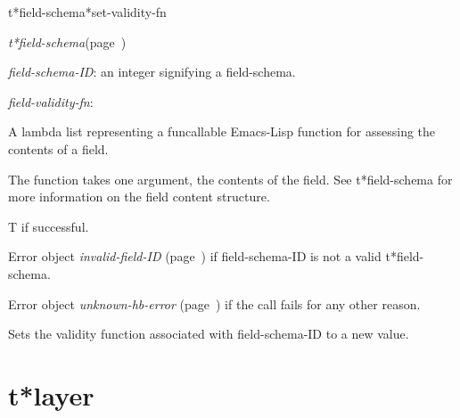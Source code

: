 \begin{description}
\item [Name:]  t*field-schema*set-validity-fn

\item [Class:] {\sl t*field-schema}\hfill(page~\pageref{t*field-schema})

\item [Parameters:]
\item {\sl field-schema-ID}:  an integer signifying a field-schema.

\item {\sl field-validity-fn}:  

A lambda list representing a funcallable Emacs-Lisp function for
assessing the contents of a field.

The function takes one argument, the contents of the field.
See t*field-schema for more information on the field content
structure.




\item [Return-value:] 
T if successful.

Error object {\sl invalid-field-ID} (page~\pageref{invalid-field-ID}) if field-schema-ID is not a valid t*field-schema.

Error object {\sl unknown-hb-error} (page~\pageref{unknown-hb-error}) if the call fails
for any other reason. 

\item [Description:]

Sets the validity function associated with field-schema-ID
to a new value. 


\item [Public:]



\end{description}
\horizontalline

\section{t*layer}
\label{t*layer}

